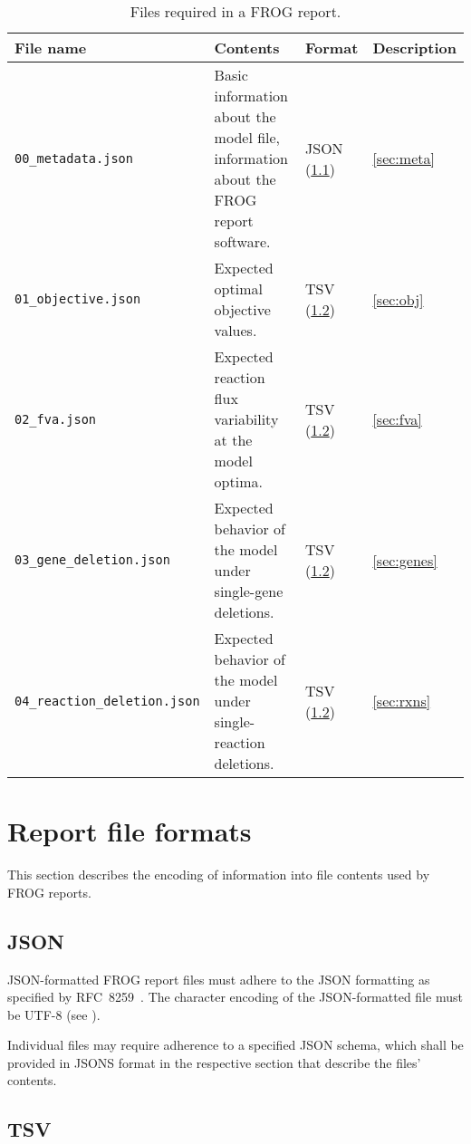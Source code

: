 \begin{table}\footnotesize\sffamily
\begin{tabular}{lp{.3\linewidth}ll}
\toprule
File name & Contents & Format & Description \\
\midrule
\texttt{00\_metadata.json}
 & Basic information about the model file, information about the FROG report software.
 & JSON (\cref{sec:json})
 & \cref{sec:meta}
 \\\addlinespace
\texttt{01\_objective.json}
 & Expected optimal objective values.
 & TSV (\cref{sec:tsv})
 & \cref{sec:obj}
 \\\addlinespace
\texttt{02\_fva.json}
 & Expected reaction flux variability at the model optima.
 & TSV (\cref{sec:tsv})
 & \cref{sec:fva}
 \\\addlinespace
\texttt{03\_gene\_deletion.json}
 & Expected behavior of the model under single-gene deletions.
 & TSV (\cref{sec:tsv})
 & \cref{sec:genes}
 \\\addlinespace
\texttt{04\_reaction\_deletion.json}
 & Expected behavior of the model under single-reaction deletions.
 & TSV (\cref{sec:tsv})
 & \cref{sec:rxns} \\
\bottomrule
\end{tabular}
\caption{Files required in a FROG report.}
\label{tab:files}
\end{table}

\section{Report file formats}

This section describes the encoding of information into file contents used by FROG reports.

\subsection{JSON}
\label{sec:json}

JSON-formatted FROG report files must adhere to the JSON formatting as specified by RFC~8259~\cite{rfc8259}.
The character encoding of the JSON-formatted file must be UTF-8 (see \cite[Section 8.1]{rfc8259}).

Individual files may require adherence to a specified JSON schema, which shall be provided in JSONS format in the respective section that describe the files' contents.

\subsection{TSV}
\label{sec:tsv}

